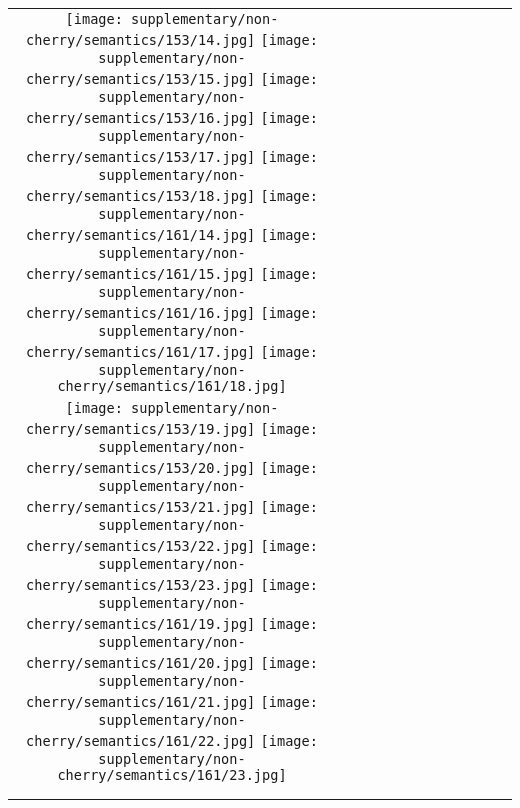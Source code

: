 \begin{figure*}[tb!]
{\begin{tabular}{c c c c c c c c c c c c }
\tabularnewline
  \texttt{[image: supplementary/non-cherry/semantics/153/14.jpg]}
  \texttt{[image: supplementary/non-cherry/semantics/153/15.jpg]}
  \texttt{[image: supplementary/non-cherry/semantics/153/16.jpg]}
  \texttt{[image: supplementary/non-cherry/semantics/153/17.jpg]}
  \texttt{[image: supplementary/non-cherry/semantics/153/18.jpg]}
    \hspace{5mm}
  \texttt{[image: supplementary/non-cherry/semantics/161/14.jpg]}
  \texttt{[image: supplementary/non-cherry/semantics/161/15.jpg]}
  \texttt{[image: supplementary/non-cherry/semantics/161/16.jpg]}
  \texttt{[image: supplementary/non-cherry/semantics/161/17.jpg]}
  \texttt{[image: supplementary/non-cherry/semantics/161/18.jpg]}

\tabularnewline
  \texttt{[image: supplementary/non-cherry/semantics/153/19.jpg]}
  \texttt{[image: supplementary/non-cherry/semantics/153/20.jpg]}
  \texttt{[image: supplementary/non-cherry/semantics/153/21.jpg]}
  \texttt{[image: supplementary/non-cherry/semantics/153/22.jpg]}
  \texttt{[image: supplementary/non-cherry/semantics/153/23.jpg]}
    \hspace{5mm}
  \texttt{[image: supplementary/non-cherry/semantics/161/19.jpg]}
  \texttt{[image: supplementary/non-cherry/semantics/161/20.jpg]}
  \texttt{[image: supplementary/non-cherry/semantics/161/21.jpg]}
  \texttt{[image: supplementary/non-cherry/semantics/161/22.jpg]}
  \texttt{[image: supplementary/non-cherry/semantics/161/23.jpg]}
    \tabularnewline

 \hspace{0.5mm}
  \tabularnewline
\vspace{2mm}
\vspace{-2\baselineskip}
\end{tabular}}
\vspace{-0.8cm}
\hspace{20pt}
\label{fig:sup2}
\end{figure*}%